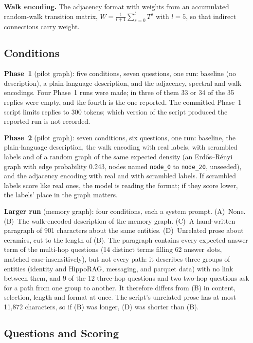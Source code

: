 \documentclass[11pt,a4paper]{article}
\begin{document}
\textbf{Walk encoding.} The adjacency format with weights from an accumulated random-walk transition matrix, $W = \frac{1}{l+1}\sum_{s=0}^{l} T^s$ with $l=5$, so that indirect connections carry weight.

\subsection{Conditions}

\textbf{Phase~1} (pilot graph): five conditions, seven questions, one run: baseline (no description), a plain-language description, and the adjacency, spectral and walk encodings. Four Phase~1 runs were made; in three of them 33 or 34 of the 35 replies were empty, and the fourth is the one reported. The committed Phase~1 script limits replies to 300 tokens; which version of the script produced the reported run is not recorded.

\textbf{Phase~2} (pilot graph): seven conditions, six questions, one run: baseline, the plain-language description, the walk encoding with real labels, with scrambled labels and of a random graph of the same expected density (an Erd\H{o}s--R\'enyi graph with edge probability 0.243, nodes named \texttt{node\_0} to \texttt{node\_20}, unseeded), and the adjacency encoding with real and with scrambled labels. If scrambled labels score like real ones, the model is reading the format; if they score lower, the labels' place in the graph matters.

\textbf{Larger run} (memory graph): four conditions, each a system prompt. (A)~None. (B)~The walk-encoded description of the memory graph. (C)~A hand-written paragraph of 901 characters about the same entities. (D)~Unrelated prose about ceramics, cut to the length of (B). The paragraph contains every expected answer term of the multi-hop questions (14 distinct terms filling 62 answer slots, matched case-insensitively), but not every path: it describes three groups of entities (identity and HippoRAG, messaging, and parquet data) with no link between them, and 9 of the 12 three-hop questions and two two-hop questions ask for a path from one group to another. It therefore differs from (B) in content, selection, length and format at once. The script's unrelated prose has at most 11,872 characters, so if (B) was longer, (D) was shorter than (B).

\subsection{Questions and Scoring}
\end{document}
